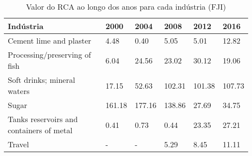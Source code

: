 \begin{table}
\centering
\caption{Valor do RCA ao longo dos anos para cada indústria (FJI)}
\begin{tabular}{p{6cm}p{1.5cm}p{1.5cm}p{1.5cm}p{1.5cm}p{1.5cm}}
\toprule
                               Indústria &   2000 &   2004 &   2008 &   2012 &   2016 \\
\midrule
                 Cement lime and plaster &   4.48 &   0.40 &   5.05 &   5.01 &  12.82 \\
           Processing/preserving of fish &   6.04 &  24.56 &  23.02 &  30.12 &  19.06 \\
             Soft drinks; mineral waters &  17.15 &  52.63 & 102.31 & 101.38 & 107.73 \\
                                   Sugar & 161.18 & 177.16 & 138.86 &  27.69 &  34.75 \\
Tanks reservoirs and containers of metal &   0.41 &   0.73 &   0.44 &  23.35 &  27.21 \\
                                  Travel &      - &      - &   5.29 &   8.45 &  11.11 \\
\bottomrule
\end{tabular}
\end{table}
